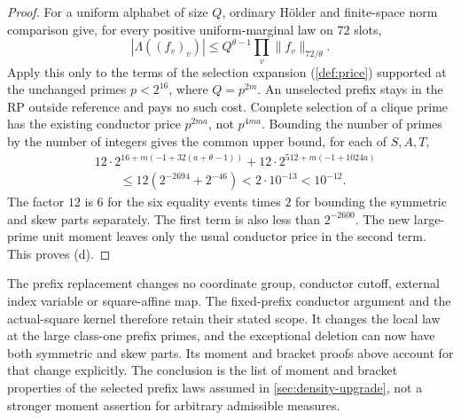 \begin{proof}
For a uniform alphabet of size $Q$, ordinary H\"older and finite-space
norm comparison give, for every positive uniform-marginal law on $72$ slots,
\[
 |\Lambda((f_v)_v)|\le Q^{\theta-1}
                    \prod_v\|f_v\|_{72/\theta}.
\]
Apply this only to the terms of the selection expansion (\cref{def:price}) supported at the unchanged primes $p<2^{16}$, where $Q=p^{2m}$. An unselected prefix stays in the RP outside
reference and pays no such cost. Complete selection of a clique prime
has the existing conductor price $p^{2ma}$, not $p^{4ma}$.
Bounding the number of primes by the number of integers gives the common
upper bound, for each of $S,A,T$,
\begin{align*}
 &12\cdot2^{16+m(-1+32(a+\theta-1))}
   +12\cdot2^{512+m(-1+1024a)}\\
 &\qquad\le12\left(2^{-2694}+2^{-46}\right)
       <2\cdot10^{-13}<10^{-12}.
\end{align*}
The factor $12$ is $6$ for the six equality events times $2$ for bounding the symmetric and skew parts separately. The first term is also less than $2^{-2600}$.
The new large-prime unit moment leaves only the usual conductor price
in the second term. This proves (d).
\end{proof}

\begin{remark}
The prefix replacement changes no coordinate group, conductor cutoff,
external index variable or square-affine map. The fixed-prefix conductor
argument and the actual-square kernel therefore retain their stated
scope. It changes the local law at the large class-one prefix primes,
and the exceptional deletion can now have both symmetric and skew parts.
Its moment and bracket proofs above account for that change explicitly.
The conclusion is the list of moment and bracket properties of the selected prefix laws assumed in \cref{sec:density-upgrade},
not a stronger moment assertion for arbitrary admissible measures.
\end{remark}

